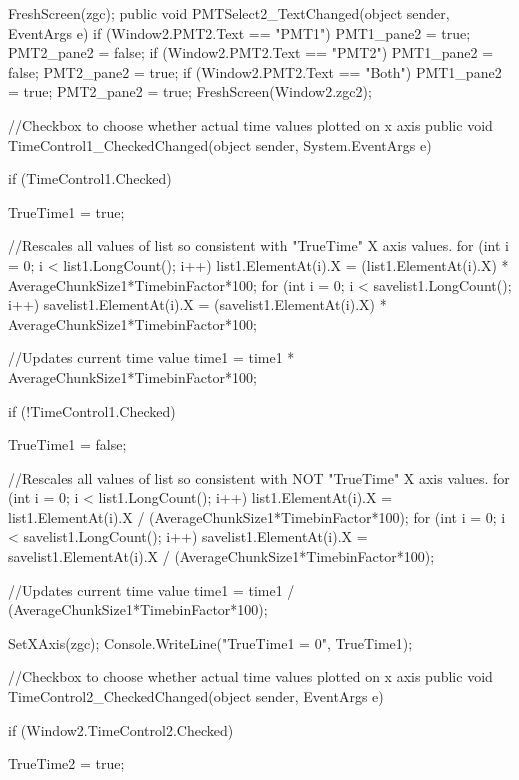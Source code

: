 {{{            FreshScreen(zgc);
        }
        public void PMTSelect2_TextChanged(object sender, EventArgs e)
        {
            if (Window2.PMT2.Text == "PMT1")
            {
                PMT1_pane2 = true;
                PMT2_pane2 = false;
            }
            if (Window2.PMT2.Text == "PMT2")
            {
                PMT1_pane2 = false;
                PMT2_pane2 = true;
            }
            if (Window2.PMT2.Text == "Both")
            {
                PMT1_pane2 = true;
                PMT2_pane2 = true;
            }
            FreshScreen(Window2.zgc2);
        }

        //Checkbox to choose whether actual time values plotted on x axis
        public void TimeControl1_CheckedChanged(object sender, System.EventArgs e)
        {
            if (TimeControl1.Checked)
            {
                TrueTime1 = true;
                
                //Rescales all values of list so consistent with "TrueTime" X axis values.
                for (int i = 0; i < list1.LongCount(); i++)
                {
                    list1.ElementAt(i).X = (list1.ElementAt(i).X) * AverageChunkSize1*TimebinFactor*100;
                }
                for (int i = 0; i < savelist1.LongCount(); i++)
                {
                    savelist1.ElementAt(i).X = (savelist1.ElementAt(i).X) * AverageChunkSize1*TimebinFactor*100;
                }

                //Updates current time value
                time1 = time1 * AverageChunkSize1*TimebinFactor*100;
            }
            if (!TimeControl1.Checked)
            {
                TrueTime1 = false;

                //Rescales all values of list so consistent with NOT "TrueTime" X axis values.
                for (int i = 0; i < list1.LongCount(); i++)
                {
                    list1.ElementAt(i).X = list1.ElementAt(i).X / (AverageChunkSize1*TimebinFactor*100);
                }
                for (int i = 0; i < savelist1.LongCount(); i++)
                {
                    savelist1.ElementAt(i).X = savelist1.ElementAt(i).X / (AverageChunkSize1*TimebinFactor*100);
                }

                //Updates current time value
                time1 = time1 / (AverageChunkSize1*TimebinFactor*100);
            }
            SetXAxis(zgc);
            Console.WriteLine("TrueTime1 = {0}", TrueTime1);
        }

        //Checkbox to choose whether actual time values plotted on x axis
        public void TimeControl2_CheckedChanged(object sender, EventArgs e)
        {
            if (Window2.TimeControl2.Checked)
            {
                TrueTime2 = true;

}}}}
